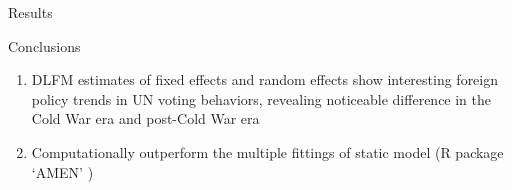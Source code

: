 \documentclass[serif,mathserif,final,table]{beamer}
\begin{document}
\begin{frame}{}
\begin{columns}[t]
\begin{column}{0.235\linewidth}
\begin{block}{Results}
	\end{block}
	
	\begin{block}{Conclusions}
		\begin{enumerate}
\item DLFM estimates of fixed effects and random effects show interesting foreign policy trends in UN voting behaviors, revealing noticeable difference in the Cold War era and post-Cold War era
\item Computationally outperform the multiple fittings of static model (R package `AMEN' \cite{hoff2014amen})
			\end{enumerate}
	\end{block}
	

\end{column}
  \end{columns}
\end{frame}
\end{document}
